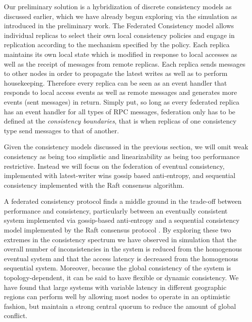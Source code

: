 \documentclass{article}
\begin{document}
Our preliminary solution is a hybridization of discrete consistency models as discussed earlier, which we have already begun exploring via the simulation as introduced in the preliminary work. The Federated Consistency model allows individual replicas to select their own local consistency policies and engage in replication according to the mechanism specified by the policy. Each replica maintains its own local state which is modified in response to local accesses as well as the receipt of messages from remote replicas. Each replica sends messages to other nodes in order to propagate the latest writes as well as to perform housekeeping. Therefore every replica can be seen as an event handler that responds to local access events as well as remote messages and generates more events (sent messages) in return. Simply put, so long as every federated replica has an event handler for all types of RPC messages, federation only has to be defined at the \textit{consistency boundaries}, that is when replicas of one consistency type send messages to that of another.

Given the consistency models discussed in the previous section, we will omit weak consistency as being too simplistic and linearizability as being too performance restrictive. Instead we will focus on the federation of eventual consistency, implemented with latest-writer wins gossip based anti-entropy, and sequential consistency implemented with the Raft consensus algorithm.

A federated consistency protocol finds a middle ground in the trade-off between performance and consistency, particularly between an eventually consistent system implemented via gossip-based anti-entropy \cite{kempe_gossip-based_2003} and a sequential consistency model implemented by the Raft consensus protocol \cite{ongaro_search_2014}. By exploring these two extremes in the consistency spectrum we have observed in simulation that the overall number of inconsistencies in the system is reduced from the homogenous eventual system and that the access latency is decreased from the homogenous sequential system. Moreover, because the global consistency of the system is topology-dependent, it can be said to have flexible or dynamic consistency. We have found that large systems with variable latency in different geographic regions can perform well by allowing most nodes to operate in an optimistic fashion, but maintain a strong central quorum to reduce the amount of global conflict.
\end{document}
